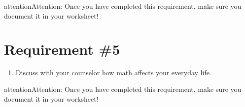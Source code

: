 \documentclass[letterpaper,10pt,english]{sphinxmanual}
\begin{document}
\begin{sphinxadmonition}{attention}{Attention:}
Once you have completed this requirement, make sure you document it in your worksheet!
\end{sphinxadmonition}


\chapter{Requirement \#5}
\label{\detokenize{requirement5:requirement-5}}\label{\detokenize{requirement5::doc}}\begin{enumerate}
%
\setcounter{enumi}{4}
\item {} 
Discuss with your counselor how math affects your everyday life.

\end{enumerate}

\begin{sphinxadmonition}{attention}{Attention:}
Once you have completed this requirement, make sure you document it in your worksheet!
\end{sphinxadmonition}




\renewcommand{\indexname}{Index}
\printindex
\end{document}
